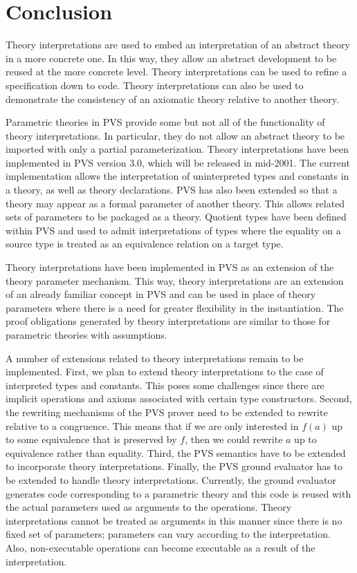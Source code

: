\documentclass[11pt,twoside,openright,titlepage]{cslreport}
\begin{document}
\chapter{Conclusion}

Theory interpretations are used to embed an interpretation of an abstract
theory in a more concrete one.  In this way, they allow an abstract
development to be reused at the more concrete level.  Theory
interpretations can be used to refine a specification down to code.
Theory interpretations can also be used to demonstrate the consistency of
an axiomatic theory relative to another theory.

Parametric theories in PVS provide some but not all of the functionality
of theory interpretations.  In particular, they do not allow an abstract
theory to be imported with only a partial parameterization.  Theory
interpretations have been implemented in PVS version 3.0, which will be
released in mid-2001.  The current implementation allows the
interpretation of uninterpreted types and constants in a theory, as well
as theory declarations.  PVS has also been extended so that a theory may
appear as a formal parameter of another theory.  This allows related sets
of parameters to be packaged as a theory.  Quotient types have been
defined within PVS and used to admit interpretations of types where the
equality on a source type is treated as an equivalence relation on a
target type.

Theory interpretations have been implemented in PVS as an extension of the
theory parameter mechanism.  This way, theory interpretations are
an extension of an already familiar concept in PVS and can be used in
place of theory parameters where there is a need for greater
flexibility in the instantiation.  The proof obligations generated by
theory interpretations are similar to those for parametric theories
with assumptions.  

A number of extensions related to theory interpretations remain to be
implemented.  First, we plan to extend theory interpretations to the case
of interpreted types and constants.  This poses some challenges since
there are implicit operations and axioms associated with certain type
constructors.  Second, the rewriting mechanisms of the PVS prover need to
be extended to rewrite relative to a congruence.  This means that if we
are only interested in $f(a)$ up to some equivalence that is preserved by
$f$, then we could rewrite $a$ up to equivalence rather than equality.
Third, the PVS semantics have to be extended to incorporate theory
interpretations.  Finally, the PVS ground evaluator has to be extended to
handle theory interpretations.  Currently, the ground evaluator generates
code corresponding to a parametric theory and this code is reused with the
actual parameters used as arguments to the operations.  Theory
interpretations cannot be treated as arguments in this manner since there
is no fixed set of parameters; parameters can vary according to the
interpretation.  Also, non-executable operations can become executable as
a result of the interpretation.
\end{document}
